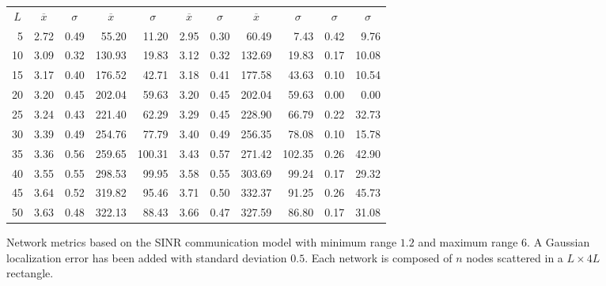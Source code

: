 \documentclass{article}
\begin{document}
\begin{figure}[h]
\begin{center}
\begin{tabular}{|r|rr|rr|rr|rr|rr|}
\hline
\multicolumn{1}{|c|}{$L$} & \multicolumn{1}{|c}{$\overline{x}$} & \multicolumn{1}{c|}{$\sigma$} & \multicolumn{1}{|c}{$\overline{x}$} & \multicolumn{1}{c|}{$\sigma$} & \multicolumn{1}{|c}{$\overline{x}$} & \multicolumn{1}{c|}{$\sigma$} & \multicolumn{1}{|c}{$\overline{x}$} & \multicolumn{1}{c|}{$\sigma$} & \multicolumn{1}{|c}{$\sigma$} & \multicolumn{1}{c|}{$\sigma$}\\
5  & 2.72 & 0.49 &  55.20 &  11.20 & 2.95 & 0.30 &  60.49 &   7.43 & 0.42 & 9.76\\
10 & 3.09 & 0.32 & 130.93 &  19.83 & 3.12 & 0.32 & 132.69 &  19.83 & 0.17 & 10.08\\
15 & 3.17 & 0.40 & 176.52 &  42.71 & 3.18 & 0.41 & 177.58 &  43.63 & 0.10 & 10.54\\
20 & 3.20 & 0.45 & 202.04 &  59.63 & 3.20 & 0.45 & 202.04 &  59.63 & 0.00 & 0.00\\
25 & 3.24 & 0.43 & 221.40 &  62.29 & 3.29 & 0.45 & 228.90 &  66.79 & 0.22 & 32.73\\
30 & 3.39 & 0.49 & 254.76 &  77.79 & 3.40 & 0.49 & 256.35 &  78.08 & 0.10 & 15.78\\
35 & 3.36 & 0.56 & 259.65 & 100.31 & 3.43 & 0.57 & 271.42 & 102.35 & 0.26 & 42.90\\
40 & 3.55 & 0.55 & 298.53 &  99.95 & 3.58 & 0.55 & 303.69 &  99.24 & 0.17 & 29.32\\
45 & 3.64 & 0.52 & 319.82 &  95.46 & 3.71 & 0.50 & 332.37 &  91.25 & 0.26 & 45.73\\
50 & 3.63 & 0.48 & 322.13 &  88.43 & 3.66 & 0.47 & 327.59 &  86.80 & 0.17 & 31.08\\
\hline
\end{tabular}
\caption{Network metrics based on the SINR communication model with minimum range $1.2$ and maximum range $6$. A Gaussian localization error has been added with standard deviation $0.5$. Each network is composed of $n$ nodes scattered in a $L\times 4L$ rectangle.}
\label{exp_sinrScal}
\end{center}
\end{figure}
 
\end{document}
